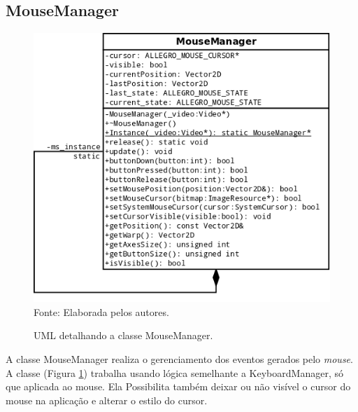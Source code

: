 \subsection{MouseManager}
%
%
\begin{figure}[H]
    \centering
    \caption{UML detalhando a classe MouseManager.}
    \label{MouseManager}
    \includegraphics[scale = 0.40]{uml/MouseManager.png}
    \\Fonte: Elaborada pelos autores.
\end{figure}
%
%
\par
A classe MouseManager realiza o gerenciamento dos eventos gerados pelo \textit{mouse}. A classe (Figura \ref{MouseManager}) trabalha usando lógica semelhante a KeyboardManager, só que aplicada ao mouse. Ela Possibilita também deixar ou não visível o cursor do mouse na aplicação e alterar o estilo do cursor.
%
%
